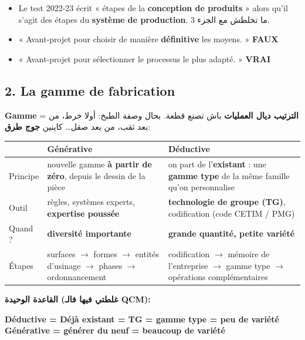 \documentclass[11pt,a4paper]{article}
\newcommand{\ar}[1]{\textarabic{#1}}
\newcommand{\fr}[1]{\textfrench{#1}}
\newcommand{\vrai}{\textcolor{vert}{\textbf{VRAI}}}
\newcommand{\faux}{\textcolor{rouge}{\textbf{FAUX}}}
\begin{document}
\begin{piege}
\begin{itemize}
\item Le test 2022-23 écrit « étapes de la \textbf{conception de produits} » alors qu'il s'agit des étapes du \textbf{système de production}. \ar{ما تخلطش مع الجزء 3.}
\item « Avant-projet pour choisir de manière \textbf{définitive} les moyens. » \faux
\item « Avant-projet pour sélectionner le processus le plus adapté. » \vrai
\end{itemize}
\end{piege}

\subsection*{2. La gamme de fabrication}
\par\begin{Arabic}
\fr{\textbf{Gamme}} = \textbf{الترتيب ديال العمليات} باش تصنع قطعة. بحال وصفة الطبخ: أولا خرط، من بعد ثقب، من بعد صقل… كاينين \textbf{جوج طرق}:
\end{Arabic}
\begin{center}
\begin{tabularx}{\linewidth}{l X X}
\toprule
& \textbf{Générative} & \textbf{Déductive} \\
\midrule
Principe & nouvelle gamme \textbf{à partir de zéro}, depuis le dessin de la pièce & on part de l'\textbf{existant} : une \textbf{gamme type} de la même famille qu'on personnalise \\
Outil & règles, systèmes experts, \textbf{expertise poussée} & \textbf{technologie de groupe (TG)}, codification (code CETIM / PMG) \\
Quand ? & \textbf{diversité importante} & \textbf{grande quantité, petite variété} \\
Étapes & surfaces $\rightarrow$ formes $\rightarrow$ entités d'usinage $\rightarrow$ phases $\rightarrow$ ordonnancement & codification $\rightarrow$ mémoire de l'entreprise $\rightarrow$ gamme type $\rightarrow$ opérations complémentaires \\
\bottomrule
\end{tabularx}
\end{center}

\begin{note}
\par\begin{Arabic}
\textbf{القاعدة الوحيدة (غلطتي فيها فالـ QCM):}
\end{Arabic}
\centering
\textbf{\textcolor{bleu}{D}éductive = \textcolor{bleu}{D}éjà existant = TG = gamme type = peu de variété}\\
\textbf{Générative = générer du neuf = beaucoup de variété}
\end{note}
\end{document}
